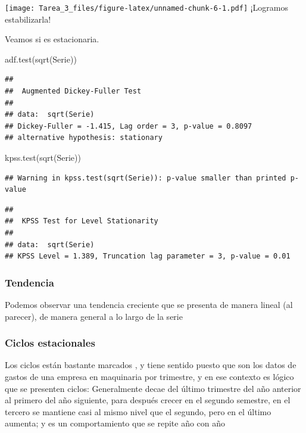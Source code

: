 \documentclass[
]{article}
\newenvironment{Shaded}{\begin{snugshade}}{\end{snugshade}}
\newcommand{\FunctionTok}[1]{\textcolor[rgb]{0.00,0.00,0.00}{#1}}
\newcommand{\NormalTok}[1]{#1}
\begin{document}
\texttt{[image: Tarea\_3\_files/figure-latex/unnamed-chunk-6-1.pdf]}
¡Logramos estabilizarla!

Veamos si es estacionaria.

\begin{Shaded}
\begin{Highlighting}[]
\FunctionTok{adf.test}\NormalTok{(}\FunctionTok{sqrt}\NormalTok{(Serie))}
\end{Highlighting}
\end{Shaded}

\begin{verbatim}
## 
##  Augmented Dickey-Fuller Test
## 
## data:  sqrt(Serie)
## Dickey-Fuller = -1.415, Lag order = 3, p-value = 0.8097
## alternative hypothesis: stationary
\end{verbatim}

\begin{Shaded}
\begin{Highlighting}[]
\FunctionTok{kpss.test}\NormalTok{(}\FunctionTok{sqrt}\NormalTok{(Serie))}
\end{Highlighting}
\end{Shaded}

\begin{verbatim}
## Warning in kpss.test(sqrt(Serie)): p-value smaller than printed p-value
\end{verbatim}

\begin{verbatim}
## 
##  KPSS Test for Level Stationarity
## 
## data:  sqrt(Serie)
## KPSS Level = 1.389, Truncation lag parameter = 3, p-value = 0.01
\end{verbatim}

\hypertarget{tendencia}{%
\subsubsection{Tendencia}\label{tendencia}}

Podemos observar una tendencia creciente que se presenta de manera
lineal (al parecer), de manera general a lo largo de la serie

\hypertarget{ciclos-estacionales}{%
\subsubsection{Ciclos estacionales}\label{ciclos-estacionales}}

Los ciclos están bastante marcados , y tiene sentido puesto que son los
datos de gastos de una empresa en maquinaria por trimestre, y en ese
contexto es lógico que se presenten ciclos: Generalmente decae del
último trimestre del año anterior al primero del año siguiente, para
después crecer en el segundo semestre, en el tercero se mantiene casi al
mismo nivel que el segundo, pero en el último aumenta; y es un
comportamiento que se repite año con año
\end{document}
